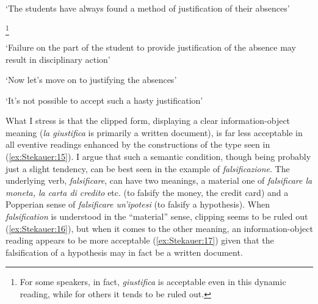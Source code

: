 \documentclass[output=paper]{langsci/langscibook}
\begin{document}
\begin{exe}
\ex\label{ex:Stekauer:15}
\begin{xlist}

\trans `The students have always found a method of justification of their
absences'

 \footnote{For
  some speakers, in fact, \emph{giustifica} is acceptable even in this
  dynamic reading, while for others it tends to be ruled out.}

\trans `Failure on the part of the student to provide justification of the absence may
result in disciplinary action'


\trans `Now let's move on to justifying the absences'


\trans `It's not possible to accept such a hasty justification'
\end{xlist}
\end{exe}

What I stress is that the clipped form, displaying a clear
information-object meaning (\emph{la giustifica} is primarily a written
document), is far less acceptable in all eventive readings enhanced by
the constructions of the type seen in (\ref{ex:Stekauer:15}). I argue that such a semantic
condition, though being probably just a slight tendency, can be best
seen in the example of \emph{falsificazione}. The underlying verb,
\emph{falsificare}, can have two meanings, a material one of
\emph{falsificare la moneta, la carta di credito} etc. (to falsify the
money, the credit card) and a Popperian sense of \emph{falsificare
un'ipotesi} (to falsify a hypothesis). When  \emph{falsification} is
understood in the ``material'' sense, clipping seems to be ruled out (\ref{ex:Stekauer:16}), but when it comes to the other meaning, an information-object
reading appears to be more acceptable (\ref{ex:Stekauer:17}) given that the
falsification of a hypothesis may in fact be a written document.
\end{document}
